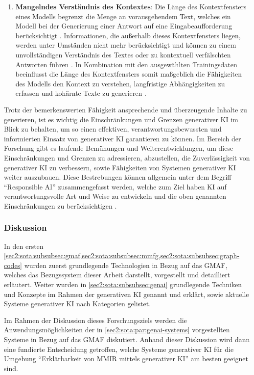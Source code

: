 \begin{enumerate}
    \item \textbf{Mangelndes Verständnis des Kontextes}: 
    Die Länge des Kontextfensters eines Modells begrenzt die Menge an vorausgehendem Text, welches ein Modell bei der Generierung einer Antwort auf eine Eingabeaufforderung berücksichtigt \cite{v7labs-llm-limitations}.
    Informationen, die außerhalb dieses Kontextfensters liegen, werden unter Umständen nicht mehr berücksichtigt und können zu einem unvollständigen Verständnis des Textes oder zu kontextuell verfälschten Antworten führen \cite{v7labs-llm-limitations}.
    In Kombination mit den ausgewählten Trainingsdaten beeinflusst die Länge des Kontextfensters somit maßgeblich die Fähigkeiten des Modells den Kontext zu verstehen, langfristige Abhängigkeiten zu erfassen und kohärnte Texte zu generieren \cite{v7labs-llm-limitations}.
\end{enumerate}

Trotz der bemerkenswerten Fähigkeit ansprechende und überzeugende Inhalte zu generieren, ist es wichtig die Einschränkungen und Grenzen generativer KI im Blick zu behalten, um so einen effektiven, verantwortungsbewussten und informierten Einsatz von generativer KI garantieren zu können.
Im Bereich der Forschung gibt es laufende Bemühungen und Weiterentwicklungen, um diese Einschränkungen und Grenzen zu adressieren, abzustellen, die Zuverlässigkeit von generativer KI zu verbessern, sowie Fähigkeiten von Systemen generativer KI weiter auszubauen.
Diese Bestrebungen können allgemein unter dem Begriff \enquote{Responsible AI} zusammengefasst werden, welche zum Ziel haben KI auf verantwortungsvolle Art und Weise zu entwickeln und die oben genannten Einschränkungen zu berücksichtigen \cite{gabler-responsible-ai}.

\subsubsection{Diskussion}
\label{sec2:sota:subsubsec:fz1:discussion}
In den ersten {\cref{sec2:sota:subsubsec:gmaf,sec2:sota:subsubsec:mmfg,sec2:sota:subsubsec:graph-codes}} wurden zuerst grundlegende Technologien in Bezug auf das GMAF, welches das Bezugssystem dieser Arbeit darstellt, vorgestellt und detailliert erläutert.
Weiter wurden in \cref{sec2:sota:subsubsec:genai} grundlegende Techniken und Konzepte im Rahmen der generativen KI genannt und erklärt, sowie aktuelle Systeme generativer KI nach Kategorien gelistet.

Im Rahmen der Diskussion dieses Forschungsziels werden die Anwendungsmöglichkeiten der in \cref{sec2:sota:par:genai-systems} vorgestellten Systeme in Bezug auf das GMAF diskutiert.
Anhand dieser Diskussion wird dann eine fundierte Entscheidung getroffen, welche Systeme generativer KI für die Umgebung \enquote{Erklärbarkeit von MMIR mittels generativer KI} am besten geeignet sind.

